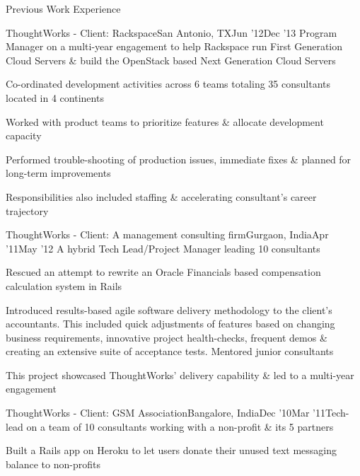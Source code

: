\documentclass{resume} %
\begin{document}
\begin{rSection}{Previous Work Experience}
\begin{rSubsection}{ThoughtWorks - Client: Rackspace}{San Antonio, TX}{Jun '12}{Dec '13}
{Program Manager on a multi-year engagement to help Rackspace run
  First Generation Cloud Servers \& build the OpenStack based Next
  Generation Cloud Servers}

\item Co-ordinated development activities across 6 teams
  totaling 35 consultants located in 4 continents
\item Worked with product teams to prioritize features \& allocate development capacity
\item Performed trouble-shooting of production issues, immediate fixes \& planned for long-term improvements
\item Responsibilities also included staffing \& accelerating consultant's career trajectory
\end{rSubsection}


\begin{rSubsection}{ThoughtWorks - Client: A management consulting
    firm}{Gurgaon, India}{Apr '11}{May '12}
  {A hybrid Tech Lead/Project Manager leading 10 consultants}

\item Rescued an attempt to rewrite an Oracle Financials based compensation calculation system in Rails
\item Introduced results-based agile software delivery
  methodology to the client's accountants. This included quick
  adjustments of features based on changing business requirements, innovative
  project health-checks, frequent demos \& creating an extensive suite
  of acceptance tests. Mentored junior consultants
\item This project showcased ThoughtWorks' delivery capability \& led to a multi-year engagement

\end{rSubsection}


\begin{rSubsection}{ThoughtWorks - Client: GSM Association}{Bangalore, India}{Dec '10}{Mar '11}{Tech-lead on a team of 10 consultants working with a non-profit
  \& its 5 partners}
\item Built a Rails app on Heroku to let users donate their unused text messaging balance to non-profits


\end{rSubsection}
\end{rSection}
\end{document}

